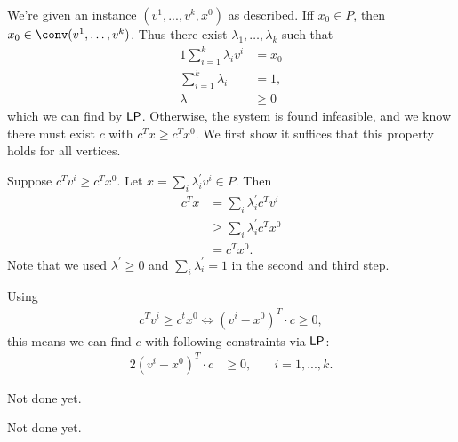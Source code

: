 \begin{aufgabe}
    We're given an instance $(v^1,...,v^k,x^0)$ as described. Iff $x_0 \in P$,
    then $x_0 \in \conv(v^1,\dots,v^k)$. Thus there exist $\lambda_1,\dots,\lambda_k$ such that
    \begin{alignat*}{1}
        \sum_{i=1}^k\lambda_i v^i & = x_0  \\
        \sum_{i=1}^k\lambda_i     & =1,    \\
        \lambda                   & \geq 0
    \end{alignat*}
    which we can find by $\mathsf{LP}$. Otherwise, the system is found infeasible, and we know there must
    exist $c$ with $c^Tx \geq c^Tx^0$. We first show it suffices that this property holds for all vertices.

    Suppose $c^Tv^i \geq c^Tx^0$. Let $x = \sum_i \lambda^\prime_i v^i \in P$. Then
    \begin{align*}
        c^Tx & = \sum_i \lambda^\prime_i c^T v^i   \\
             & \geq \sum_i \lambda^\prime_i c^Tx^0 \\
             & = c^Tx^0.
    \end{align*}
    Note that we used $\lambda^\prime \geq 0$ and $\sum_i \lambda^\prime_i =1$ in the second and third step.

    Using
    \begin{align*}
        c^Tv^i \geq c^tx^0 \Leftrightarrow (v^i - x^0)^T \cdot c \geq 0,
    \end{align*}
    this means we can find $c$ with following constraints via $\mathsf{LP}$:
    \begin{alignat*}{2}
        (v^i - x^0)^T \cdot c & \geq 0, & \quad i = 1,...,k.
    \end{alignat*}
\end{aufgabe}
\begin{aufgabe}
 Not done yet.
\end{aufgabe}
\begin{aufgabe}
 Not done yet.
\end{aufgabe}